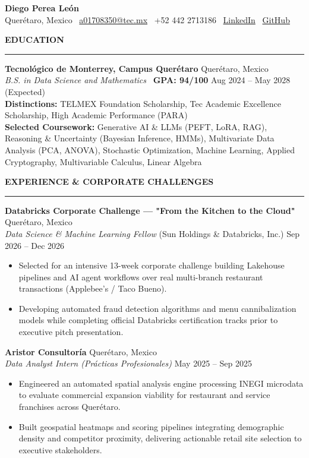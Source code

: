 \documentclass[10pt,letterpaper]{article}
\newcommand{\cvsection}[1]{%
  \vspace{3.5pt}%
  {\small\textbf{\MakeUppercase{#1}}}\\[-3.5pt]%
  \rule{\textwidth}{0.4pt}\par\vspace{2pt}%
}
\begin{document}
\begin{center}
    {\LARGE \textbf{Diego Perea León}}\\[2pt]
    \small Querétaro, Mexico \textbullet\ \href{mailto:a01708350@tec.mx}{a01708350@tec.mx} \textbullet\ +52 442 2713186 \textbullet\ \href{https://www.linkedin.com/in/diego-perea-le%C3%B3n-bbba81335/}{LinkedIn} \textbullet\ \href{https://github.com/Perea094}{GitHub}
\end{center}
\vspace{-6pt}

\cvsection{Education}
\textbf{Tecnológico de Monterrey, Campus Querétaro} \hfill Querétaro, Mexico\\
\textit{B.S. in Data Science and Mathematics} \textbullet\ \textbf{GPA: 94/100} \hfill Aug 2024 – May 2028 (Expected)\\
\textbf{Distinctions:} TELMEX Foundation Scholarship, Tec Academic Excellence Scholarship, High Academic Performance (PARA)\\
\textbf{Selected Coursework:} Generative AI \& LLMs (PEFT, LoRA, RAG), Reasoning \& Uncertainty (Bayesian Inference, HMMs), Multivariate Data Analysis (PCA, ANOVA), Stochastic Optimization, Machine Learning, Applied Cryptography, Multivariable Calculus, Linear Algebra

\cvsection{Experience \& Corporate Challenges}

\textbf{Databricks Corporate Challenge — "From the Kitchen to the Cloud"} \hfill Querétaro, Mexico\\
\textit{Data Science \& Machine Learning Fellow} (Sun Holdings \& Databricks, Inc.) \hfill Sep 2026 – Dec 2026
\begin{itemize}
    \item Selected for an intensive 13-week corporate challenge building Lakehouse pipelines and AI agent workflows over real multi-branch restaurant transactions (Applebee's / Taco Bueno).
    \item Developing automated fraud detection algorithms and menu cannibalization models while completing official Databricks certification tracks prior to executive pitch presentation.
\end{itemize}

\vspace{2pt}
\textbf{Aristor Consultoría} \hfill Querétaro, Mexico\\
\textit{Data Analyst Intern (Prácticas Profesionales)} \hfill May 2025 – Sep 2025
\begin{itemize}
    \item Engineered an automated spatial analysis engine processing INEGI microdata to evaluate commercial expansion viability for restaurant and service franchises across Querétaro.
    \item Built geospatial heatmaps and scoring pipelines integrating demographic density and competitor proximity, delivering actionable retail site selection to executive stakeholders.
\end{itemize}
\end{document}
